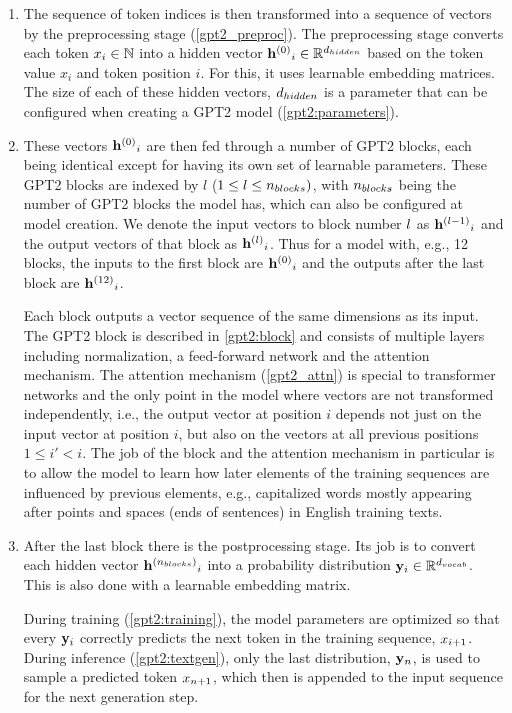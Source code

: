 \begin{enumerate}
	\item The sequence of token indices is then transformed into a sequence of vectors by the preprocessing stage (\cref{gpt2_preproc}). The preprocessing stage converts each token ${x}_i \in \mathbb{N}$ into a hidden vector ${\mathbf{h}^{(0)}}_i \in \mathbb{R}^{d_{hidden}}$ based on the token value $x_i$ and token position $i$. For this, it uses learnable embedding matrices.
	The size of each of these hidden vectors, ${d_{hidden}}$ is a parameter that can be configured when creating a GPT2 model (\cref{gpt2:parameters}).
	
	\item These vectors ${\mathbf{h}^{(0)}}_i$ are then fed through a number of GPT2 blocks, each being identical except for having its own set of learnable parameters. These GPT2 blocks are indexed by $l$ ($1 \leq l \leq {n_{blocks}})$, with ${n_{blocks}}$ being the number of GPT2 blocks the model has, which can also be configured at model creation.
	We denote the input vectors to block number ${l}$ as ${\mathbf{h}^{({l}-1)}}_i$ and the output vectors of that block as ${\mathbf{h}^{({l})}}_i$. Thus for a model with, e.g., 12 blocks, the inputs to the first block are ${\mathbf{h}^{(0)}}_i$ and the outputs after the last block are ${\mathbf{h}^{(12)}}_i$.
	
	Each block outputs a vector sequence of the same dimensions as its input.
	The GPT2 block is described in \cref{gpt2:block} and consists of multiple layers including normalization, a feed-forward network and the attention mechanism. The attention mechanism (\cref{gpt2_attn}) is special to transformer networks and the only point in the model where vectors are not transformed independently, i.e., the output vector at position $i$ depends not just on the input vector at position $i$, but also on the vectors at all previous positions $1 \leq i' < i$.
	The job of the block and the attention mechanism in particular is to allow the model to learn how later elements of the training sequences are influenced by previous elements, e.g., capitalized words mostly appearing after points and spaces (ends of sentences) in English training texts.
	
	\item After the last block there is the postprocessing stage. Its job is to convert each hidden vector ${\mathbf{h}^{({n_{blocks}})}}_i$ into a probability distribution ${\mathbf{y}}_i \in \mathbb{R}^{{d_{vocab}}}$. This is also done with a learnable embedding matrix.
	
	During training (\cref{gpt2:training}), the model parameters are optimized so that every ${\mathbf{y}}_i$ correctly predicts the next token in the training sequence, ${x}_{i+1}$.
	During inference (\cref{gpt2:textgen}), only the last distribution, ${\mathbf{y}}_n$, is used to sample a predicted token ${x}_{n+1}$, which then is appended to the input sequence for the next generation step.
\end{enumerate}

